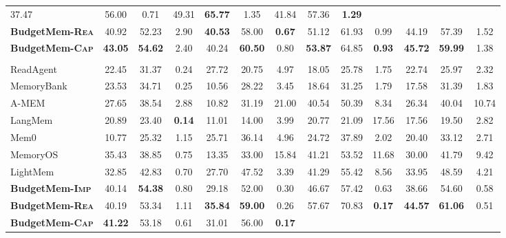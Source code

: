 \begin{table}[t]
\begin{tabular}{lcccccccccccc}
        37.47 & 56.00 & 0.71 &
        49.31 & \textbf{65.77} & 1.35 &
        41.84 & 57.36 & \textbf{1.29} \\
        \rowcolor{row-highlight}\textbf{BudgetMem-\textsc{Rea}} &
        40.92 & 52.23 & 2.90 &
        \textbf{40.53} & 58.00 & \textbf{0.67} &
        51.12 & 61.93 & 0.99 &
        44.19 & 57.39 & 1.52 \\
        \rowcolor{row-highlight}\textbf{BudgetMem-\textsc{Cap}} &
        \textbf{43.05} & \textbf{54.62} & 2.40 &
        40.24 & \textbf{60.50} & 0.80 &
        \textbf{53.87} & 64.85 & \textbf{0.93} &
        \textbf{45.72} & \textbf{59.99} & 1.38 \\
        \midrule
        \rowcolor{white}
        \multicolumn{13}{l}{\textbf{Qwen3-Next-80B-A3B-Instruct}$^\dagger$} \\
        ReadAgent & 22.45 & 31.37 & 0.24 & 27.72 & 20.75 & 4.97 & 18.05 & 25.78 & 1.75 & 22.74 & 25.97& 2.32 \\
        MemoryBank & 23.53 & 34.71 & 0.25 & 10.56 & 28.22 & 3.45 & 18.64 & 31.25 & 1.79 & 17.58 & 31.39 & 1.83 \\
        A-MEM & 27.65 & 38.54 & 2.88 & 10.82 & 31.19 & 21.00 & 40.54 & 50.39 & 8.34 & 26.34& 40.04& 10.74\\
        LangMem & 20.89 & 23.40 & \textbf{0.14} & 11.01 & 14.00 & 3.99 & 20.77 & 21.09 & 17.56 & 17.56 & 19.50 & 2.82 \\
        Mem0 & 10.77 & 25.32 & 1.15 & 25.71 & 36.14 & 4.96 & 24.72 & 37.89 & 2.02 & 20.40 & 33.12 & 2.71 \\
        MemoryOS & 35.43 & 38.85 & 0.75 & 13.35 & 33.00 & 15.84 & 41.21 & 53.52 & 11.68 & 30.00 & 41.79 & 9.42 \\
        LightMem & 32.85 & 42.83 & 0.70 & 27.70 & 47.52 & 3.39 & 41.29 & 55.42 & 8.56& 33.95 & 48.59 & 4.21 \\
        \midrule
        \rowcolor{row-highlight}\textbf{BudgetMem-\textsc{Imp}} &
        40.14 & \textbf{54.38} & 0.80 &
        29.18 & 52.00 & 0.30 &
        46.67 & 57.42 & 0.63 &
        38.66 & 54.60 & 0.58 \\
        \rowcolor{row-highlight}\textbf{BudgetMem-\textsc{Rea}} &
        40.19 & 53.34 & 1.11 &
        \textbf{35.84} & \textbf{59.00} & 0.26 &
        57.67 & 70.83 & \textbf{0.17} &
        \textbf{44.57} & \textbf{61.06} & 0.51 \\
        \rowcolor{row-highlight}\textbf{BudgetMem-\textsc{Cap}} &
        \textbf{41.22} & 53.18 & 0.61 &
        31.01 & 56.00 & \textbf{0.17} &

\end{tabular}
\end{table}
